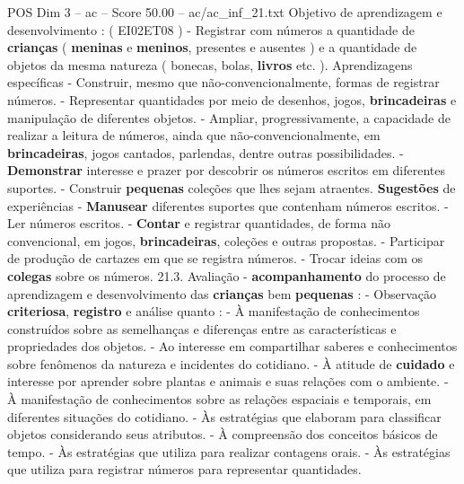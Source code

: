 \begin{textsample}{POS Dim 3 – ac – Score 50.00 – ac/ac\_inf\_21.txt}
Objetivo de aprendizagem e desenvolvimento : ( EI02ET08 ) - Registrar com números a quantidade de \textbf{crianças} ( \textbf{meninas} e \textbf{meninos}, presentes e ausentes ) e a quantidade de objetos da mesma natureza ( bonecas, bolas, \textbf{livros} etc. ).
Aprendizagens específicas - Construir, mesmo que não-convencionalmente, formas de registrar números. - Representar quantidades por meio de desenhos, jogos, \textbf{brincadeiras} e manipulação de diferentes objetos. - Ampliar, progressivamente, a capacidade de realizar a leitura de números, ainda que não-convencionalmente, em \textbf{brincadeiras}, jogos cantados, parlendas, dentre outras possibilidades. - \textbf{Demonstrar} interesse e prazer por descobrir os números escritos em diferentes suportes. - Construir \textbf{pequenas} coleções que lhes sejam atraentes. \textbf{Sugestões} de experiências - \textbf{Manusear} diferentes suportes que contenham números escritos. - Ler números escritos. - \textbf{Contar} e registrar quantidades, de forma não convencional, em jogos, \textbf{brincadeiras}, coleções e outras propostas. - Participar de produção de cartazes em que se registra números. - Trocar ideias com os \textbf{colegas} sobre os números. 21.3.
Avaliação - \textbf{acompanhamento} do processo de aprendizagem e desenvolvimento das \textbf{crianças} bem \textbf{pequenas} : - Observação \textbf{criteriosa}, \textbf{registro} e análise quanto : - À manifestação de conhecimentos construídos sobre as semelhanças e diferenças entre as características e propriedades dos objetos. - Ao interesse em compartilhar saberes e conhecimentos sobre fenômenos da natureza e incidentes do cotidiano. - À atitude de \textbf{cuidado} e interesse por aprender sobre plantas e animais e suas relações com o ambiente. - À manifestação de conhecimentos sobre as relações espaciais e temporais, em diferentes situações do cotidiano. - Às estratégias que elaboram para classificar objetos considerando seus atributos. - À compreensão dos conceitos básicos de tempo. - Às estratégias que utiliza para realizar contagens orais. - Às estratégias que utiliza para registrar números para representar quantidades.

\end{textsample}
